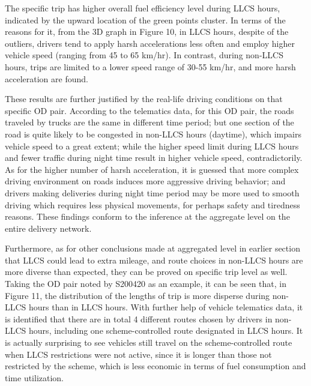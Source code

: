 \documentclass[preprint,12pt,3p]{elsarticle}
\begin{document}
The specific trip has higher overall fuel efficiency level during LLCS hours, indicated by the upward location of the green points cluster. In terms of the reasons for it, from the 3D graph in Figure 10, in LLCS hours, despite of the outliers, drivers tend to apply harsh accelerations less often and employ higher vehicle speed (ranging from 45 to 65 km/hr). In contrast, during non-LLCS hours, trips are limited to a lower speed range of 30-55 km/hr, and more harsh acceleration are found. 

These results are further justified by the real-life driving conditions on that specific OD pair. According to the telematics data, for this OD pair, the roads traveled by trucks are the same in different time period; but one section of the road is quite likely to be congested in non-LLCS hours (daytime), which impairs vehicle speed to a great extent; while the higher speed limit during LLCS hours and fewer traffic during night time result in higher vehicle speed, contradictorily. As for the higher number of harsh acceleration, it is guessed that more complex driving environment on roads induces more aggressive driving behavior; and drivers making deliveries during night time period may be more used to smooth driving which requires less physical movements, for perhaps safety and tiredness reasons. These findings conform to the inference at the aggregate level on the entire delivery network. 



Furthermore, as for other conclusions made at aggregated level in earlier section that LLCS could lead to extra mileage, and route choices in non-LLCS hours are more diverse than expected, they can be proved on specific trip level as well. Taking the OD pair noted by S200420 as an example, it can be seen that, in Figure 11, the distribution of the lengths of trip is more disperse during non-LLCS hours than in LLCS hours. With further help of vehicle telematics data, it is identified that there are in total 4 different routes chosen by drivers in non-LLCS hours, including one scheme-controlled route designated in LLCS hours. It is actually surprising to see vehicles still travel on the scheme-controlled route when LLCS restrictions were not active, since it is longer than those not restricted by the scheme, which is less economic in terms of fuel consumption and time utilization. 
\end{document}
